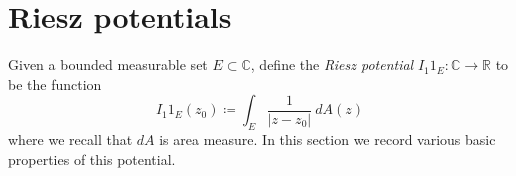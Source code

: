 \documentclass[12pt]{amsart}
\newcommand{\R}{\mathbb{R}}
\newcommand{\C}{\mathbb{C}}
\begin{document}
\section{Riesz potentials}\label{riesz-sec}

Given a bounded measurable set $E \subset \C$, define the \emph{Riesz potential} $I_1 1_E \colon \C \to \R$ to be the function
$$ I_1 1_E(z_0) \coloneqq \int_{E} \frac{1}{|z-z_0|}\ dA(z)$$
where we recall that  $dA$ is area measure.  In this section we record various basic properties of this potential.


\end{document}
